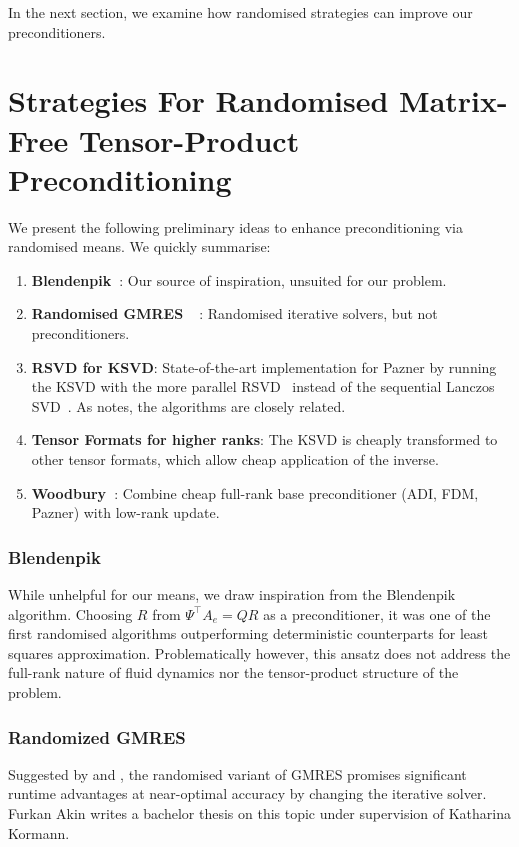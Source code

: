 \documentclass[12pt]{report}
\theoremstyle{remark}
\begin{document}
In the next section, we examine how randomised strategies can improve our preconditioners.

\section*{Strategies For Randomised Matrix-Free Tensor-Product Preconditioning}
We present the following preliminary ideas to enhance preconditioning via randomised means. We quickly summarise:
\begin{enumerate}
\item \textbf{Blendenpik~\cite{avron2010blendenpik}}: Our source of inspiration, unsuited for our problem.

\item \textbf{Randomised GMRES~\cite{nakatsukasa2024fast}~\cite{balabanov2022randomized}}: Randomised iterative solvers, but not preconditioners.

\item \textbf{RSVD for KSVD}: State-of-the-art implementation for Pazner by running the KSVD with the more parallel RSVD~\cite{T23} instead of the sequential Lanczos SVD~\cite[Alg. 2]{pazner2018approximate}. As \cite{T23} notes, the algorithms are closely related. 

\item \textbf{Tensor Formats for higher ranks}: The KSVD is cheaply transformed to other tensor formats, which allow cheap application of the inverse.

\item \textbf{Woodbury~\cite{akgun2001fast}}: Combine cheap full-rank base preconditioner (ADI, FDM, Pazner) with low-rank update.
\end{enumerate}

\subsubsection{Blendenpik}
While unhelpful for our means, we draw inspiration from the Blendenpik~\cite{avron2010blendenpik} algorithm. Choosing $R$ from $\Psi^\top A_e = QR$ as a preconditioner, it was one of the first randomised algorithms outperforming deterministic counterparts for least squares approximation. Problematically however, this ansatz does not address the full-rank nature of fluid dynamics nor the tensor-product structure of the problem.

\subsubsection{Randomized GMRES}
Suggested by \cite{nakatsukasa2024fast} and \cite{balabanov2022randomized}, the randomised variant of GMRES promises significant runtime advantages at near-optimal accuracy by changing the iterative solver. Furkan Akin writes a bachelor thesis on this topic under supervision of Katharina Kormann.
\end{document}
